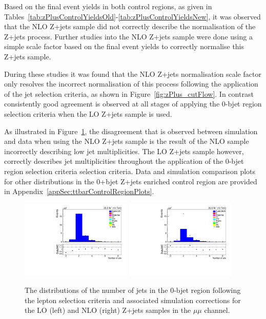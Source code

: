 Based on the final event yields in both control regions, as given in Tables~\ref{tab:zPlusControlYieldsOld}-\ref{tab:zPlusControlYieldsNew}, it was observed that the NLO Z+jets sample did not correctly describe the normalisation of the Z+jets process.
Further studies into the NLO Z+jets sample were done using a simple scale factor based on the final event yields to correctly normalise this Z+jets sample.

During these studies it was found that the NLO Z+jets normalisation scale factor only resolves the incorrect normalisation of this process following the application of the jet selection criteria, as shown in Figure~\ref{fig:zPlus_cutFlow}.
In contrast consistently good agreement is observed at all stages of applying the 0-bjet region selection criteria when the LO Z+jets sample is used.

As illustrated in Figure~\ref{fig:zPlusCR_nJets}, the disagreement that is observed between simulation and data when using the NLO Z+jets sample is the result of the NLO sample incorrectly describing low jet multiplicities.
The LO Z+jets sample however, correctly describes jet multiplicities throughout the application of the 0-bjet region selection criteria selection criteria.
Data and simulation comparison plots for other distributions in the 0+bjet Z+jets enriched control region are provided in Appendix~\ref{appSec:ttbarControlRegionPlots}.

\begin{figure}[!h]
\centering
\includegraphics[width=0.47\textwidth]{figs/background-estimation/plots/unblinded/DY_control_old_prompt_mumu_ttbarInc/numbJets_SingleTop_lepSel_mumu.pdf}
\includegraphics[width=0.47\textwidth]{figs/background-estimation/plots/unblinded/DY_control_old_prompt_mumu_DYamcatnlo/numbJets_SingleTop_lepSel_mumu.pdf}
\caption{
The distributions of the number of jets in the 0-bjet region following the lepton selection criteria and associated simulation corrections for the LO (left) and NLO (right) Z+jets samples in the $\mu\mu$ channel.
}
\label{fig:zPlusCR_nJets}
\end{figure}

